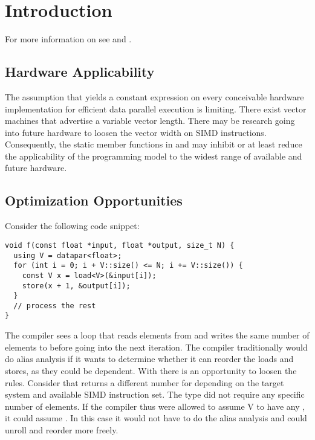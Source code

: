 \section{Introduction}

For more information on \datapar see \cite{P0214R0} and \cite{Kretz2015}.

\subsection{Hardware Applicability}
The assumption that \datapar[<T>::size()] yields a constant expression on every conceivable hardware implementation for efficient data parallel execution is limiting.
There exist vector machines that advertise a variable vector length.
There may be research going into future hardware to loosen the vector width on SIMD instructions.
Consequently, the static member functions  in \datapar and \mask may inhibit or at least reduce the applicability of the programming model to the widest range of available and future hardware.

\subsection{Optimization Opportunities}
Consider the following code snippet:
\smallskip\begin{lstlisting}[style=Vc]
void f(const float *input, float *output, size_t N) {
  using V = datapar<float>;
  for (int i = 0; i + V::size() <= N; i += V::size()) {
    const V x = load<V>(&input[i]);
    store(x + 1, &output[i]);
  }
  // process the rest
}
\end{lstlisting}
The compiler sees a loop that reads  elements from  and writes the same number of elements to  before going into the next iteration.
The compiler traditionally would do alias analysis if it wants to determine whether it can reorder the loads and stores, as they could be dependent.
With \datapar there is an opportunity to loosen the rules.
Consider that \datapar[<float>] returns a different number for  depending on the target system and available SIMD instruction set.
The type did not require any specific number of elements.
If the compiler thus were allowed to assume \type V to have any , it could assume .
In this case it would not have to do the alias analysis and could unroll and reorder more freely.

